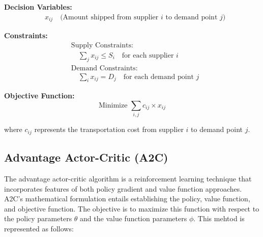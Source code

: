 \documentclass[lettersize,journal]{IEEEtran}
\begin{document}


\textbf{Decision Variables:}
\begin{align}
    & x_{ij} \quad \text{(Amount shipped from supplier $i$ to demand point $j$)}
\end{align}

\textbf{Constraints:}
\begin{align}
    & \text{Supply Constraints:} \\
    & \quad \sum_{j} x_{ij} \leq S_i \quad \text{for each supplier $i$} \\
    & \text{Demand Constraints:} \\
    & \quad \sum_{i} x_{ij} = D_j \quad \text{for each demand point $j$}
\end{align}

\textbf{Objective Function:}
\begin{equation}
    \text{Minimize } \sum_{i,j} c_{ij} \times x_{ij}
\end{equation}

where $c_{ij}$ represents the transportation cost from supplier $i$ to demand point $j$.





\subsection*{Advantage Actor-Critic (A2C)}

The advantage actor-critic algorithm is a reinforcement learning technique that incorporates features of both policy gradient and value function approaches. A2C's mathematical formulation entails establishing the policy, value function, and objective function. The objective is to maximize this function with respect to the policy parameters  $\theta$ and the value function parameters  $\phi$.
This mehtod is represented as follows:
\end{document}
